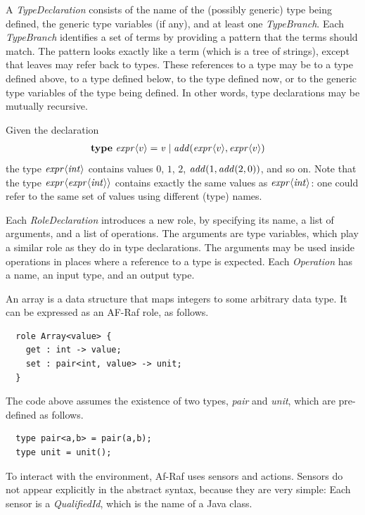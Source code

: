 \documentclass[a4paper,12pt,oneside,fleqn]{book} %
\begin{document}
{A {\it TypeDeclaration\/} consists of the name of the (possibly generic)
type being defined, the generic type variables (if any), and at least one
{\it TypeBranch}. Each {\it TypeBranch\/} identifies a set of terms by
providing a pattern that the terms should match. The pattern looks exactly
like a term (which is a tree of strings), except that leaves may refer back
to types. These references to a type may be to a type defined above, to a
type defined below, to the type defined now, or to the generic type
variables of the type being defined. In other words, type declarations may
be mutually recursive.

\begin{example}
Given the declaration
\begin{align}
&{\bf type}\ {\it expr}\langle v\rangle
  = {\it v}
  \mid {\it add}({\it expr}\langle v\rangle, {\it expr}\langle v\rangle)
\end{align}
the type ${\it expr}\langle{\it int}\rangle$ contains values $0$, $1$, $2$,
${\it add}(1,{\it add}(2,0))$, and so on. Note that the type ${\it
expr}\langle{\it expr}\langle{\it int}\rangle\rangle$ contains exactly the
same values as ${\it expr}\langle{\it int}\rangle$: one could refer to the
same set of values using different (type) names.
\end{example}

Each {\it RoleDeclaration\/} introduces a new role, by specifying its name,
a list of arguments, and a list of operations. The arguments are type
variables, which play a similar role as they do in type declarations. The
arguments may be used inside operations in places where a reference to a
type is expected. Each {\it Operation\/} has a name, an input type, and an
output type.

\begin{example}
An array is a data structure that maps integers to some arbitrary data
type. It can be expressed as an AF-Raf role, as follows.
\begin{verbatim}
  role Array<value> {
    get : int -> value;
    set : pair<int, value> -> unit;
  }
\end{verbatim}
The code above assumes the existence of two types, {\it pair\/} and {\it
unit}, which are pre-defined as follows.
\begin{verbatim}
  type pair<a,b> = pair(a,b);
  type unit = unit();
\end{verbatim}
\end{example}

To interact with the environment, Af-Raf uses sensors and actions.
Sensors do not appear explicitly in the abstract syntax, because they
are very simple: Each sensor is a {\it QualifiedId}, which is the name of a
Java class.

}
\end{document}
